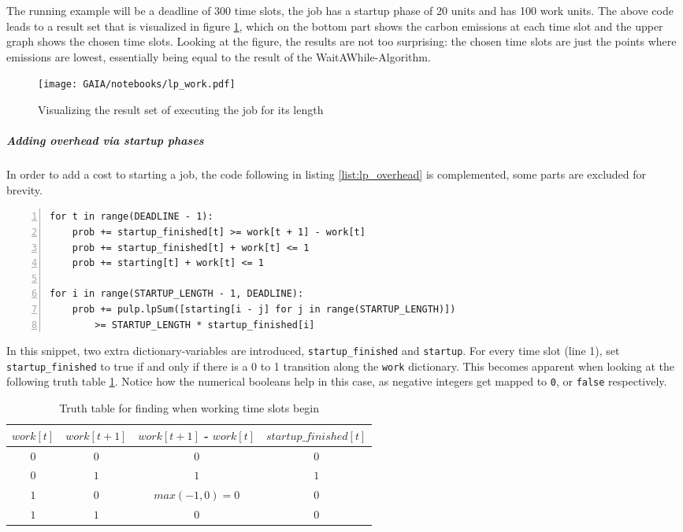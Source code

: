 The running example will be a deadline of 300 time slots, the job has a startup phase of 20 units and has 100 work units. 
The above code leads to a result set that is visualized in figure \ref{fig:lp_work},
which on the bottom part shows the carbon emissions at each time slot and the upper graph shows the chosen time slots.
Looking at the figure, the results are not too surprising: the chosen time slots are just the points where emissions are lowest, essentially being equal to the result of the WaitAWhile-Algorithm.

\begin{figure}
    \texttt{[image: GAIA/notebooks/lp\_work.pdf]}
    \caption{Visualizing the result set of executing the job for its length}
    \label{fig:lp_work}
\end{figure}

\subparagraph{Adding overhead via startup phases}

In order to add a cost to starting a job, the code following in listing \ref{list:lp_overhead} is complemented, some parts are excluded for brevity.

\begin{lstlisting}[frame=single, numbers=left, caption={LP Implementation for overhead}, label={list:lp_overhead}, basicstyle=\ttfamily]
for t in range(DEADLINE - 1):
    prob += startup_finished[t] >= work[t + 1] - work[t]
    prob += startup_finished[t] + work[t] <= 1
    prob += starting[t] + work[t] <= 1

for i in range(STARTUP_LENGTH - 1, DEADLINE):
    prob += pulp.lpSum([starting[i - j] for j in range(STARTUP_LENGTH)]) 
        >= STARTUP_LENGTH * startup_finished[i]
\end{lstlisting}

In this snippet, two extra dictionary-variables are introduced, \verb|startup_finished| and \verb|startup|.
For every time slot (line 1), set \verb|startup_finished| to true if and only if there is a 0 to 1 transition along the \verb|work| dictionary. This becomes apparent when looking at the following truth table \ref{tab:truth_table_startup_finished}.
Notice how the numerical booleans help in this case, as negative integers get mapped to \verb|0|, or \verb|false| respectively.

\begin{table}[h!]
\centering
\begin{tabular}{|c|c|c|c|}
\hline
    $work[t]$ & $work[t+1]$ & $work[t+1]$ - $work[t]$ & $startup\_finished[t]$ \\ \hline
    $0$ & $0$ & $0$ & $0$ \\ \hline
    $0$ & $1$ & $1$ & $1$ \\ \hline
    $1$ & $0$ & $max(-1, 0) = 0$ & $0$ \\ \hline
    $1$ & $1$ & $0$ & $0$ \\ \hline
\end{tabular}
\caption{Truth table for finding when working time slots begin}
\label{tab:truth_table_startup_finished}
\end{table}

